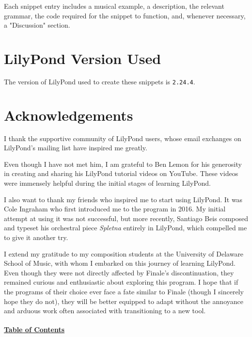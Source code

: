 Each snippet entry includes a musical example, a description, the relevant grammar, the code required for the snippet to function, and, whenever necessary, a "Discussion" section.

\section{LilyPond Version Used}
The version of LilyPond used to create these snippets is \verb|2.24.4|.

\section{Acknowledgements}
I thank the supportive community of LilyPond users, whose email exchanges on LilyPond's mailing list have inspired me greatly.

Even though I have not met him, I am grateful to Ben Lemon for his generosity in creating and sharing his LilyPond tutorial videos on YouTube. These videos were immensely helpful during the initial stages of learning LilyPond.

I also want to thank my friends who inspired me to start using LilyPond. It was Cole Ingraham who first introduced me to the program in 2016. My initial attempt at using it was not successful, but more recently, Santiago Beis composed and typeset his orchestral piece \textit{Spletna} entirely in LilyPond, which compelled me to give it another try.

I extend my gratitude to my composition students at the University of Delaware School of Music, with whom I embarked on this journey of learning LilyPond. Even though they were not directly affected by Finale's discontinuation, they remained curious and enthusiastic about exploring this program. I hope that if the programs of their choice ever face a fate similar to Finale (though I sincerely hope they do not), they will be better equipped to adapt without the annoyance and arduous work often associated with transitioning to a new tool.
\\

\hyperref[sec:toc]{\\ \textbf{Table of Contents}}


\clearpage
\vfill \break
